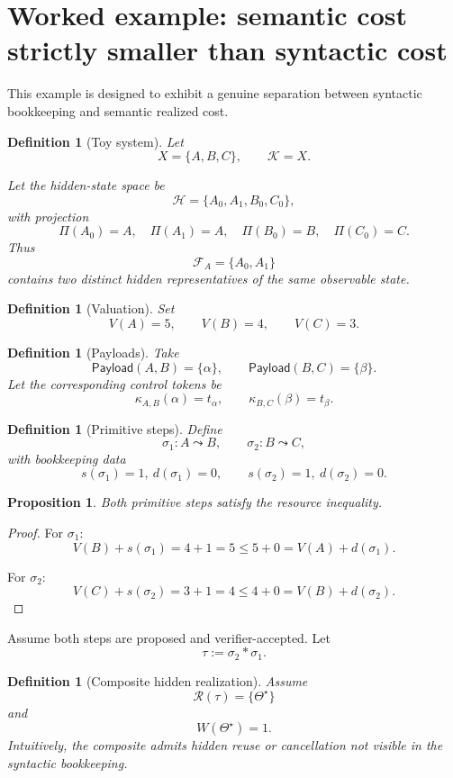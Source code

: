 \documentclass[11pt]{article}
\newtheorem{definition}[theorem]{Definition}
\newtheorem{proposition}[theorem]{Proposition}
\newcommand{\Kadm}{\mathcal{K}}
\newcommand{\Hid}{\mathcal{H}}
\newcommand{\F}{\mathcal{F}}
\newcommand{\Rset}{\mathcal{R}}
\newcommand{\Payload}{\mathsf{Payload}}
\begin{document}
\section{Worked example: semantic cost strictly smaller than syntactic cost}

This example is designed to exhibit a genuine separation between syntactic bookkeeping and semantic realized cost.

\begin{definition}[Toy system]
Let
\[
X=\{A,B,C\},
\qquad
\Kadm=X.
\]

Let the hidden-state space be
\[
\Hid=\{A_0,A_1,B_0,C_0\},
\]
with projection
\[
\Pi(A_0)=A,\quad \Pi(A_1)=A,\quad \Pi(B_0)=B,\quad \Pi(C_0)=C.
\]
Thus
\[
\F_A=\{A_0,A_1\}
\]
contains two distinct hidden representatives of the same observable state.
\end{definition}

\begin{definition}[Valuation]
Set
\[
V(A)=5,\qquad V(B)=4,\qquad V(C)=3.
\]
\end{definition}

\begin{definition}[Payloads]
Take
\[
\Payload(A,B)=\{\alpha\},
\qquad
\Payload(B,C)=\{\beta\}.
\]
Let the corresponding control tokens be
\[
\kappa_{A,B}(\alpha)=t_\alpha,\qquad \kappa_{B,C}(\beta)=t_\beta.
\]
\end{definition}

\begin{definition}[Primitive steps]
Define
\[
\sigma_1:A\leadsto B,\qquad \sigma_2:B\leadsto C,
\]
with bookkeeping data
\[
s(\sigma_1)=1,\ d(\sigma_1)=0,
\qquad
s(\sigma_2)=1,\ d(\sigma_2)=0.
\]
\end{definition}

\begin{proposition}
Both primitive steps satisfy the resource inequality.
\end{proposition}

\begin{proof}
For $\sigma_1$:
\[
V(B)+s(\sigma_1)=4+1=5\le 5+0=V(A)+d(\sigma_1).
\]

For $\sigma_2$:
\[
V(C)+s(\sigma_2)=3+1=4\le 4+0=V(B)+d(\sigma_2).
\]
\end{proof}

Assume both steps are proposed and verifier-accepted. Let
\[
\tau:=\sigma_2 * \sigma_1.
\]

\begin{definition}[Composite hidden realization]
Assume
\[
\Rset(\tau)=\{\Theta^\star\}
\]
and
\[
W(\Theta^\star)=1.
\]
Intuitively, the composite admits hidden reuse or cancellation not visible in the syntactic bookkeeping.
\end{definition}
\end{document}
